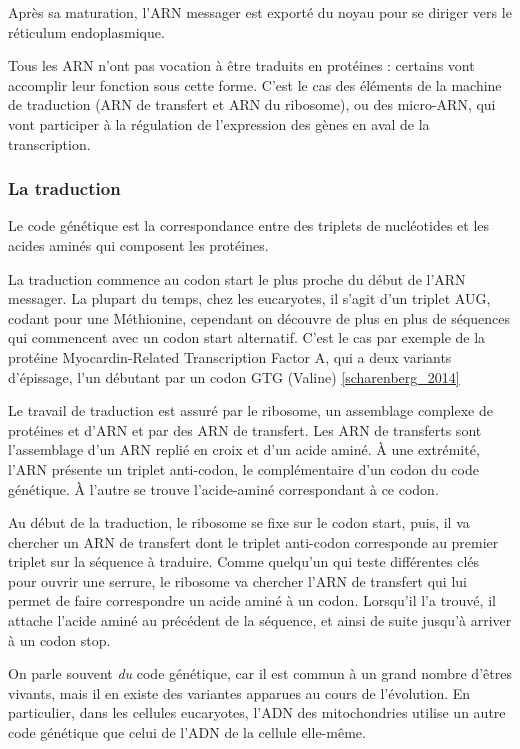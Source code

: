 Après sa maturation, l'ARN messager est exporté du noyau pour se diriger vers le réticulum endoplasmique.

Tous les ARN n'ont pas vocation à être traduits en protéines : certains vont accomplir leur fonction sous cette forme. C'est le cas des éléments de la machine de traduction (ARN de transfert et ARN du ribosome), ou des micro-ARN, qui vont participer à la régulation de l'expression des gènes en aval de la transcription.

\subsubsection{La traduction}

Le code génétique est la correspondance entre des triplets de nucléotides et les acides aminés qui composent les protéines. 

La traduction commence au codon start le plus proche du début de l'ARN messager. La plupart du temps, chez les eucaryotes, il s'agit d'un triplet AUG, codant pour une Méthionine, cependant on découvre de plus en plus de séquences qui commencent avec un codon start alternatif. C'est le cas par exemple de la protéine Myocardin-Related Transcription Factor A, qui a deux variants d'épissage, l'un débutant par un codon GTG (Valine) \ref{scharenberg_2014}

Le travail de traduction est assuré par le ribosome, un assemblage complexe de protéines et d'ARN et par des ARN de transfert. Les ARN de transferts sont l'assemblage d'un ARN replié en croix et d'un acide aminé. À une extrémité, l'ARN présente un triplet anti-codon, le complémentaire d'un codon du code génétique. À l'autre se trouve l'acide-aminé correspondant à ce codon. 

Au début de la traduction, le ribosome se fixe sur le codon start, puis, il va chercher un ARN de transfert dont le triplet anti-codon corresponde au premier triplet sur la séquence à traduire. Comme quelqu'un qui teste différentes clés pour ouvrir une serrure, le ribosome va chercher l'ARN de transfert qui lui permet de faire correspondre un acide aminé à un codon. Lorsqu'il l'a trouvé, il attache l'acide aminé au précédent de la séquence, et ainsi de suite jusqu'à arriver à un codon stop. 

On parle souvent \emph{du} code génétique, car il est commun à un grand nombre d'êtres vivants, mais il en existe des variantes apparues au cours de l'évolution. En particulier, dans les cellules eucaryotes, l'ADN des mitochondries utilise un autre code génétique que celui de l'ADN de la cellule elle-même. 

